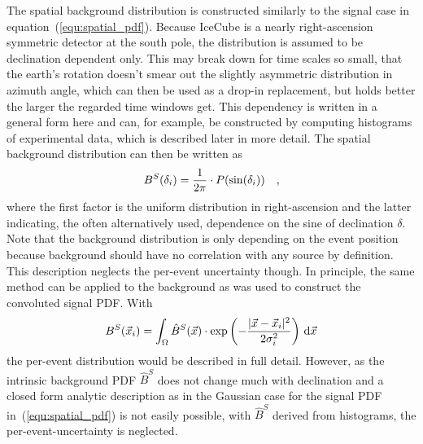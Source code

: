 The spatial background distribution is constructed similarly to the signal case in equation~(\ref{equ:spatial_pdf}).
Because IceCube is a nearly right-ascension symmetric detector at the south pole, the distribution is assumed to be declination dependent only.
This may break down for time scales so small, that the earth's rotation doesn't smear out the slightly asymmetric distribution in azimuth angle, which can then be used as a drop-in replacement, but holds better the larger the regarded time windows get.
This dependency is written in a general form here and can, for example, be constructed by computing histograms of experimental data, which is described later in more detail.
The spatial background distribution can then be written as
\begin{equation}
  B^S(\delta_i) = \frac{1}{2\pi} \cdot P(\sin(\delta_i))
  \quad\text{,}
\end{equation}
where the first factor is the uniform distribution in right-ascension and the latter indicating, the often alternatively used, dependence on the sine of declination $\delta$.
Note that the background distribution is only depending on the event position because background should have no correlation with any source by definition.
This description neglects the per-event uncertainty though.
In principle, the same method can be applied to the background as was used to construct the convoluted signal PDF.
With
\begin{equation}
  B^S(\vec{x}_i) =
    \int_\Omega \hat{B}^S(\vec{x}) \cdot
      \exp\left(-\frac{|\vec{x}-\vec{x}_i|^2}{2\sigma_i^2}\right)
      \,\mathrm{d}\vec{x}
\end{equation}
the per-event distribution would be described in full detail.
However, as the intrinsic background PDF $\hat{B}^S$ does not change much with declination and a closed form analytic description as in the Gaussian case for the signal PDF in~(\ref{equ:spatial_pdf}) is not easily possible, with $\hat{B}^S$ derived from histograms, the per-event-uncertainty is neglected.


